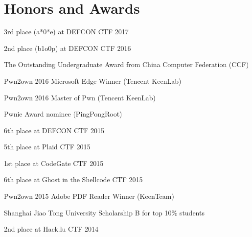 \section*{Honors and Awards}
\begin{description}
	\item 3rd place (a*0*e) at DEFCON CTF 2017 
	\item 2nd place (b1o0p) at DEFCON CTF 2016 
	\item The Outstanding Undergraduate Award from China Computer Federation (CCF) 
	\item Pwn2own 2016 Microsoft Edge Winner (Tencent KeenLab) 
	\item Pwn2own 2016 Master of Pwn (Tencent KeenLab) 
	\item Pwnie Award nominee (PingPongRoot) 
	\item 6th place at DEFCON CTF 2015 
	\item 5th place at Plaid CTF 2015 
	\item 1st place at CodeGate CTF 2015 
	\item 6th place at Ghost in the Shellcode CTF 2015 
	\item Pwn2own 2015 Adobe PDF Reader Winner (KeenTeam) 
	\item Shanghai Jiao Tong University Scholarship B for top 10\% students 
	\item 2nd place at Hack.lu CTF 2014 
\end{description}
